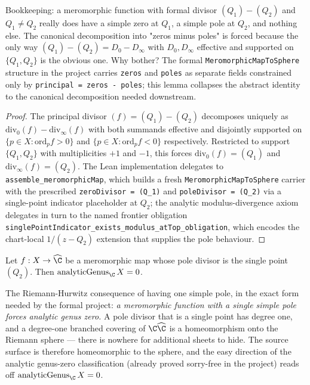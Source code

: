 \begin{layman}
Bookkeeping: a meromorphic function with formal divisor
\((Q_1) - (Q_2)\) and \(Q_1 \neq Q_2\) really does have a simple
zero at \(Q_1\), a simple pole at \(Q_2\), and nothing else. The
canonical decomposition into "zeros minus poles" is forced because
the only way \((Q_1) - (Q_2) = D_0 - D_\infty\) with \(D_0, D_\infty\)
effective and supported on \(\{Q_1, Q_2\}\) is the obvious one.
Why bother? The formal \texttt{MeromorphicMapToSphere} structure in
the project carries \texttt{zeros} and \texttt{poles} as separate
fields constrained only by \texttt{principal = zeros - poles}; this
lemma collapses the abstract identity to the canonical decomposition
needed downstream.
\end{layman}

\begin{proof}\leanok
The principal divisor \((f) = (Q_1) - (Q_2)\) decomposes uniquely as
\(\mathrm{div}_0(f) - \mathrm{div}_\infty(f)\) with both summands
effective and disjointly supported on \(\{p \in X : \mathrm{ord}_p f
> 0\}\) and \(\{p \in X : \mathrm{ord}_p f < 0\}\) respectively.
Restricted to support \(\{Q_1, Q_2\}\) with multiplicities \(+1\) and
\(-1\), this forces \(\mathrm{div}_0(f) = (Q_1)\) and
\(\mathrm{div}_\infty(f) = (Q_2)\). The Lean implementation delegates
to \texttt{assemble\_meromorphicMap}, which builds a fresh
\texttt{MeromorphicMapToSphere} carrier with the prescribed
\texttt{zeroDivisor = (Q\_1)} and \texttt{poleDivisor = (Q\_2)} via a
single-point indicator placeholder at \(Q_2\); the analytic
modulus-divergence axiom delegates in turn to the named frontier
obligation
\texttt{singlePointIndicator\_exists\_modulus\_atTop\_obligation},
which encodes the chart-local \(1/(z - Q_2)\) extension that supplies
the pole behaviour.
\end{proof}

\begin{theorem}
\label{thm:riemann-hurwitz-deg1-basis-aligned}
Let \(f : X \to \widehat{\C}\) be a meromorphic map whose pole divisor
is the single point \((Q_2)\). Then \(\mathrm{analyticGenus}_\C\, X
= 0\).
\notready
\end{theorem}

\begin{layman}
The Riemann-Hurwitz consequence of having one simple pole, in the
exact form needed by the formal project: \emph{a meromorphic function
with a single simple pole forces analytic genus zero.} A pole divisor
that is a single point has degree one, and a degree-one branched
covering of \(\C\widehat{\C}\) is a homeomorphism onto the Riemann
sphere --- there is nowhere for additional sheets to hide. The source
surface is therefore homeomorphic to the sphere, and the easy
direction of the analytic genus-zero classification (already proved
sorry-free in the project) reads off
\(\mathrm{analyticGenus}_\C\, X = 0\).
\end{layman}

